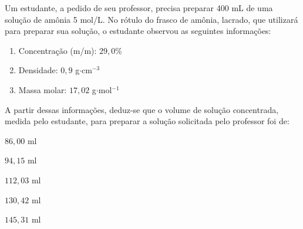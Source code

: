 Um estudante, a pedido de seu professor, precisa preparar 400 mL de uma solução de amônia 5 mol/L. No
rótulo do frasco de amônia, lacrado, que utilizará para preparar sua solução, o estudante observou as
seguintes informações:

\begin{enumerate}[label = --]
	\item Concentração (m/m): $29,0\%$
	\item Densidade: $0,9$ g$\cdot$cm$^{-3}$
	\item Massa molar: $17,02$ g$\cdot$mol$^{-1}$
\end{enumerate}

A partir dessas informações, deduz-se que o volume de solução concentrada, medida pelo estudante, para
preparar a solução solicitada pelo professor foi de:

\begin{enumerate*}[label = (\alph*), itemjoin={\qquad}]
	\item $86,00$ ml
	\item $94,15$ ml
	\item $112,03$ ml
	\item $130,42$ ml
	\item $145,31$ ml
\end{enumerate*}

